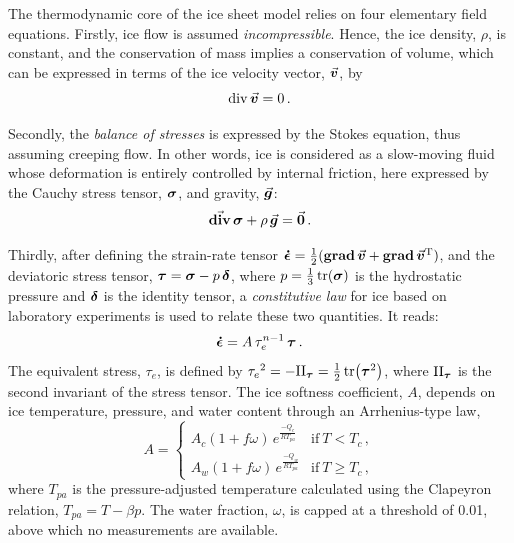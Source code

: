 \documentclass{article}
\newcommand{\vect}[1]{\va*{#1}} %
\newcommand{\tens}[1]{\vb*{#1}} %
\renewcommand{\div}[1]{\mathrm{div}\,#1}            %
\newcommand{\tdiv}[1]{\vect{\mathrm{div}}\,#1}      %
\newcommand{\tgrad}[1]{\tens{\mathrm{grad}}\,#1}    %
\newcommand{\doteps}[0]{\dot{\epsilon}} %
\newcommand{\IDT}[0]{\tens{\delta}}     %
\newcommand{\CST}[0]{\tens{\sigma}}     %
\newcommand{\DST}[0]{\tens{\tau}}       %
\newcommand{\SRT}[0]{\tens{\doteps}}    %
\newcommand{\vv}[0]{\vect{v}}           %
\begin{document}
The thermodynamic core of the ice sheet model relies on four elementary field
equations. Firstly, ice flow is assumed \emph{incompressible}. Hence, the ice
density, $\rho$, is constant, and the
conservation of mass implies a conservation of volume, which can be expressed
in terms of the ice velocity vector, $\vv$, by
\begin{equation}
    \label{eqn:incompressibility}
    \div{\vv} = 0 \,.
\end{equation}

Secondly, the \emph{balance of stresses} is expressed by the Stokes equation,
thus assuming creeping flow. In other words, ice is considered as a slow-moving
fluid whose deformation is entirely controlled by internal friction, here
expressed by the Cauchy stress tensor, $\CST$, and gravity, $\vect{g}$:
\begin{equation}
    \label{eqn:stressbalance}
    \tdiv{\CST} + \rho\,\vect{g} = \vect{0} \,.
\end{equation}

Thirdly, after defining the strain-rate tensor
${\SRT = \frac{1}{2}(\tgrad{\vv} + \tgrad{\vv}^{\mathrm{T}})}$,
and the deviatoric stress tensor, ${\DST = \CST - p\,\IDT}$,
where $p=\frac{1}{3}\tr(\CST)$ is the hydrostatic pressure and
$\tens{\delta}$ is the identity tensor, a \emph{constitutive law} for ice based
on laboratory experiments is used to relate these two quantities. It reads:
\begin{equation}
    \label{eqn:glenslaw}
    \SRT = A\,\tau_e^{n-1}\,\DST \,.
\end{equation}
The equivalent stress, $\tau_e$, is defined by
${\tau_e}^2 = -\mathrm{II}_{\DST} = \frac{1}{2} \tr(\DST^2)$,
where $\mathrm{II}_{\DST}$ is the second invariant of the stress tensor.
The ice softness coefficient, $A$, depends on ice temperature, pressure, and
water content through an Arrhenius-type law,
\begin{equation}
    A =
    \begin{cases}
        A_c (1+f\omega)\,e^\frac{-Q_c}{RT_{pa}}
            & \text{if}\ T < T_c \,, \\
        A_w (1+f\omega)\,e^\frac{-Q_w}{RT_{pa}}
            & \text{if}\ T \ge T_c \,,
    \end{cases}
\end{equation}
where $T_{pa}$ is the pressure-adjusted temperature calculated using the
Clapeyron relation, ${T_{pa} = T - \beta p}$. The water fraction, $\omega$, is
capped at a threshold of 0.01, above which no measurements are available.
\end{document}
